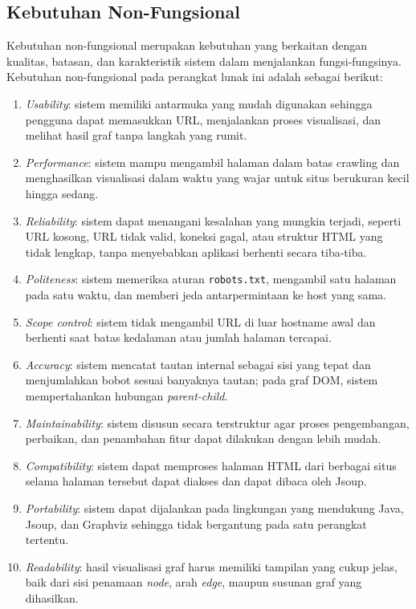 \subsection{Kebutuhan Non-Fungsional}
Kebutuhan non-fungsional merupakan kebutuhan yang berkaitan dengan kualitas, batasan, dan karakteristik sistem dalam menjalankan fungsi-fungsinya. Kebutuhan non-fungsional pada perangkat lunak ini adalah sebagai berikut:

\begin{enumerate}
    \item \textit{Usability}: sistem memiliki antarmuka yang mudah digunakan sehingga pengguna dapat memasukkan URL, menjalankan proses visualisasi, dan melihat hasil graf tanpa langkah yang rumit.
    \item \textit{Performance}: sistem mampu mengambil halaman dalam batas crawling dan menghasilkan visualisasi dalam waktu yang wajar untuk situs berukuran kecil hingga sedang.
    \item \textit{Reliability}: sistem dapat menangani kesalahan yang mungkin terjadi, seperti URL kosong, URL tidak valid, koneksi gagal, atau struktur HTML yang tidak lengkap, tanpa menyebabkan aplikasi berhenti secara tiba-tiba.
    \item \textit{Politeness}: sistem memeriksa aturan \texttt{robots.txt}, mengambil satu halaman pada satu waktu, dan memberi jeda antarpermintaan ke host yang sama.
    \item \textit{Scope control}: sistem tidak mengambil URL di luar hostname awal dan berhenti saat batas kedalaman atau jumlah halaman tercapai.
    \item \textit{Accuracy}: sistem mencatat tautan internal sebagai sisi yang tepat dan menjumlahkan bobot sesuai banyaknya tautan; pada graf DOM, sistem mempertahankan hubungan \textit{parent-child}.
    \item \textit{Maintainability}: sistem disusun secara terstruktur agar proses pengembangan, perbaikan, dan penambahan fitur dapat dilakukan dengan lebih mudah.
    \item \textit{Compatibility}: sistem dapat memproses halaman HTML dari berbagai situs selama halaman tersebut dapat diakses dan dapat dibaca oleh Jsoup.
    \item \textit{Portability}: sistem dapat dijalankan pada lingkungan yang mendukung Java, Jsoup, dan Graphviz sehingga tidak bergantung pada satu perangkat tertentu.
    \item \textit{Readability}: hasil visualisasi graf harus memiliki tampilan yang cukup jelas, baik dari sisi penamaan \textit{node}, arah \textit{edge}, maupun susunan graf yang dihasilkan.
\end{enumerate}

